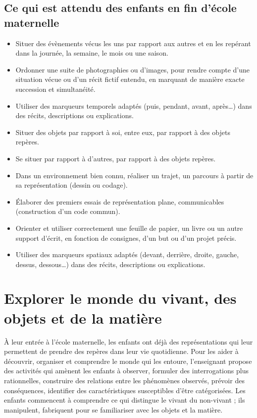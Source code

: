 \subsection{Ce qui est attendu des enfants en fin d’école maternelle}
\begin{itemize}
\item Situer des évènements vécus les uns par rapport aux autres et en les repérant dans la journée, la semaine, le mois ou une saison. 
\item Ordonner une suite de photographies ou d’images, pour rendre compte d’une situation vécue ou d’un récit fictif entendu, en marquant de manière exacte succession et simultanéité.
\item Utiliser des marqueurs temporels adaptés (puis, pendant, avant, après\dots) dans des récits, descriptions ou explications.
\item Situer des objets par rapport à soi, entre eux, par rapport à des objets repères.
\item Se situer par rapport à d’autres, par rapport à des objets repères.
\item Dans un environnement bien connu, réaliser un trajet, un parcours à partir de sa représentation (dessin ou codage). 
\item Élaborer des premiers essais de représentation plane, communicables (construction d’un code commun).
\item Orienter et utiliser correctement une feuille de papier, un livre ou un autre support d’écrit, en fonction de consignes, d’un but ou d’un projet précis.
\item Utiliser des marqueurs spatiaux adaptés (devant, derrière, droite, gauche, dessus, dessous\dots) dans des récits, descriptions ou explications.
\end{itemize}

\section{Explorer le monde du vivant, des objets et de la matière}
À leur entrée à l’école maternelle, les enfants ont déjà des représentations qui leur permettent de prendre des repères dans leur vie quotidienne. Pour les aider à découvrir, organiser et comprendre le monde qui les entoure, l’enseignant propose des activités qui amènent les enfants à observer, formuler des interrogations plus rationnelles, construire des relations entre les phénomènes observés, prévoir des conséquences, identifier des caractéristiques susceptibles d’être catégorisées. Les enfants commencent à comprendre ce qui distingue le vivant du non-vivant ; ils manipulent, fabriquent pour se familiariser avec les objets et la matière.

